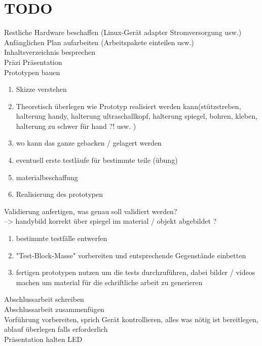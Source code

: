 \chapter{TODO}
Restliche Hardware beschaffen (Linux-Gerät adapter Stromversorgung usw.)\\
Anfänglichen Plan aufarbeiten (Arbeitspakete einteilen usw.)\\
Inhaltsverzeichnis besprechen\\
Präzi Präsentation\\
Prototypen bauen
\begin{enumerate}
\item{Skizze verstehen}
\item{Theoretisch überlegen wie Prototyp realisiert werden kann(stützstreben, halterung handy, halterung ultraschallkopf, halterung spiegel, bohren, kleben, halterung zu schwer für hand ?! usw. )}
\item{wo kann das ganze gebacken / gelagert werden}
\item eventuell erste testläufe für bestimmte teile (übung)
\item materialbeschaffung
\item Realisierung des prototypen
\end{enumerate}
Validierung anfertigen, was genau soll validiert werden?\\
--> handybild korrekt über spiegel im material / objekt abgebildet ?
\begin{enumerate}
\item{bestimmte testfälle entwerfen}
\item "Test-Block-Masse" vorbereiten und entsprechende Gegenstände einbetten
\item fertigen prototypen nutzen um die tests durchzuführen, dabei 
bilder / videos machen um material für die schriftliche arbeit zu generieren
\end{enumerate}
Abschlussarbeit schreiben\\
Abschlussarbeit zusammenfügen\\
Vorführung vorbereiten, sprich Gerät kontrollieren, alles was nötig ist bereitlegen, ablauf überlegen falls erforderlich\\
Präsentation halten
LED